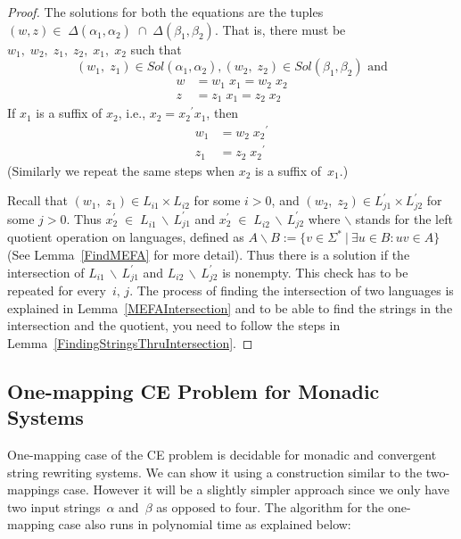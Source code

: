 \documentclass{lmcs} %
\theoremstyle{plain}\newtheorem{satz}[thm]{Satz} %
\begin{document}
\begin{proof}
The solutions for both the equations are the tuples $(w, z)
\in \; \Delta(\alpha_1^{}, \alpha_2^{})\; \cap \;\Delta(\beta_1^{},
\beta_2^{})$. That is, there must be
$w_1,\;w_2,\;z_1,\;z_2,\;x_1,\;x_2$ such that $$(w_1,\;z_1) \in
Sol(\alpha_1^{}, \alpha_2^{}), (w_2,\;z_2) \in Sol(\beta_1^{},
\beta_2^{}) \text{ and}$$ 
\begin{equation*}
\begin{aligned}
w &= w_1\; x_1= w_2 \; x_2 \\
z &= z_1\; x_1 = z_2 \; x_2
\end{aligned}
\end{equation*}
If $x_1$ is a suffix of $x_2$, i.e., $x_2 = {x_2}^{\prime} x_1$, then
\begin{equation*}
\begin{aligned}
w_1 &= w_2 \; {x_2}^{\prime}\\ 
z_1 &= z_2 \; {x_2}^{\prime}
\end{aligned}
\end{equation*}
(Similarly we repeat the same steps when $x_2$ is a suffix of~$x_1$.) 

Recall that $(w_1, \;z_1) \in L_{i1}^{} \times L_{i2}^{}$ for some
$i>0$, and  $(w_2, \;z_2) \in L_{j1}^{\prime} \times L_{j2}^{\prime}$
for some $j>0$. Thus 
$x_2^{\prime} \; \in \; L_{i1}^{} \, \backslash \, L_{j1}^{\prime}$
and $x_2^{\prime} \; \in \; L_{i2}^{} \, \backslash \, L_{j2}^{\prime}$
where $\backslash$ stands for the left quotient operation on languages,
defined as 
$A \backslash B := \{v \in \Sigma^{*} ~ | ~ \exists u \in B : uv \in A \}$ (See Lemma~\ref{FindMEFA} for more detail).  
Thus there is a solution if
the intersection of $L_{i1}^{} \, \backslash \, L_{j1}^{\prime}$
and $L_{i2}^{} \, \backslash \, L_{j2}^{\prime}$ is nonempty. This check
has to be repeated for every~$i, \, j$. The process of finding the intersection of two languages is explained in Lemma~\ref{MEFAIntersection} 
and to be able to find the strings in the intersection and the quotient, you need to follow the steps in Lemma~\ref{FindingStringsThruIntersection}.
\end{proof}

\subsection{One-mapping CE Problem for Monadic Systems}
One-mapping case of the CE problem is decidable for monadic and
convergent string rewriting systems.  We can show it using a
construction similar to the two-mappings case. However it will be a
slightly simpler approach since we only have two input
strings~$\alpha$ and~$\beta$ as opposed to four.  The algorithm
for the one-mapping case also runs in polynomial time as explained below:
\end{document}
